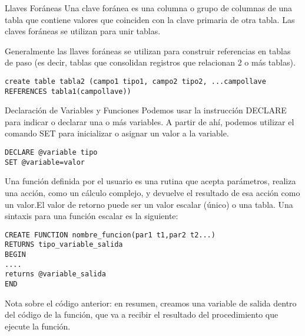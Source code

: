\begin{frame}[fragile]{Llaves Foráneas}
\protect\hypertarget{llaves-foruxe1neas}{}
Una clave foránea es una columna o grupo de columnas de una tabla que
contiene valores que coinciden con la clave primaria de otra tabla. Las
claves foráneas se utilizan para unir tablas.

Generalmente las llaves foráneas se utilizan para construir referencias
en tablas de paso (es decir, tablas que consolidan registros que
relacionan 2 o más tablas).

\begin{verbatim}
create table tabla2 (campo1 tipo1, campo2 tipo2, ...campollave REFERENCES tabla1(campollave))
\end{verbatim}
\end{frame}

\begin{frame}[fragile]{Declaración de Variables y Funciones}
\protect\hypertarget{declaraciuxf3n-de-variables-y-funciones}{}
Podemos usar la instrucción DECLARE para indicar o declarar una o más
variables. A partir de ahí, podemos utilizar el comando SET para
inicializar o asignar un valor a la variable.

\begin{verbatim}
DECLARE @variable tipo
SET @variable=valor
\end{verbatim}

Una función definida por el usuario es una rutina que acepta parámetros,
realiza una acción, como un cálculo complejo, y devuelve el resultado de
esa acción como un valor.El valor de retorno puede ser un valor escalar
(único) o una tabla. Una sintaxis para una función escalar es la
siguiente:

\begin{verbatim}
CREATE FUNCTION nombre_funcion(par1 t1,par2 t2...)
RETURNS tipo_variable_salida 
BEGIN
....
returns @variable_salida
END
\end{verbatim}

Nota sobre el código anterior: en resumen, creamos una variable de
salida dentro del código de la función, que va a recibir el resultado
del procedimiento que ejecute la función.
\end{frame}
